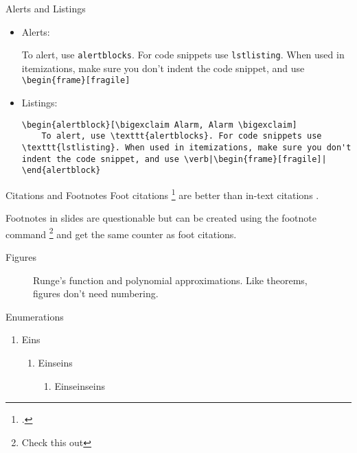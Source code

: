 \documentclass{beamer}
\begin{document}
\begin{frame}[fragile]{Alerts and Listings}
\begin{itemize}
	\item Alerts:
	\begin{alertblock}
		To alert, use \texttt{alertblocks}. For code snippets use \texttt{lstlisting}. When used in itemizations, make sure you don't indent the code snippet, and use \verb|\begin{frame}[fragile]|
	\end{alertblock}
\item Listings:
	\begin{lstlisting}
\begin{alertblock}[\bigexclaim Alarm, Alarm \bigexclaim]
	To alert, use \texttt{alertblocks}. For code snippets use \texttt{lstlisting}. When used in itemizations, make sure you don't indent the code snippet, and use \verb|\begin{frame}[fragile]|
\end{alertblock}
	\end{lstlisting}
\end{itemize}
\end{frame}

\begin{frame}{Citations and Footnotes}
Foot citations \footcite{AdamsFournier2003} are better than in-text citations \citep{AlexanderianPetraStadlerEtAl2016}.

Footnotes in slides are questionable but can be created using the footnote command \footnote{Check this out} and get the same counter as foot citations.
\end{frame}
	
\begin{frame}{Figures}
\begin{figure}
	\scalebox{0.6}{}
	\caption{Runge's function and polynomial approximations. Like theorems, figures don't need numbering.}
\end{figure}
\end{frame}

\begin{frame}{Enumerations}
\begin{enumerate}
	\item Eins
	\begin{enumerate}
		\item Einseins
		\begin{enumerate}
			\item Einseinseins
		\end{enumerate}
	\end{enumerate}
\end{enumerate}
\end{frame}
\end{document}

